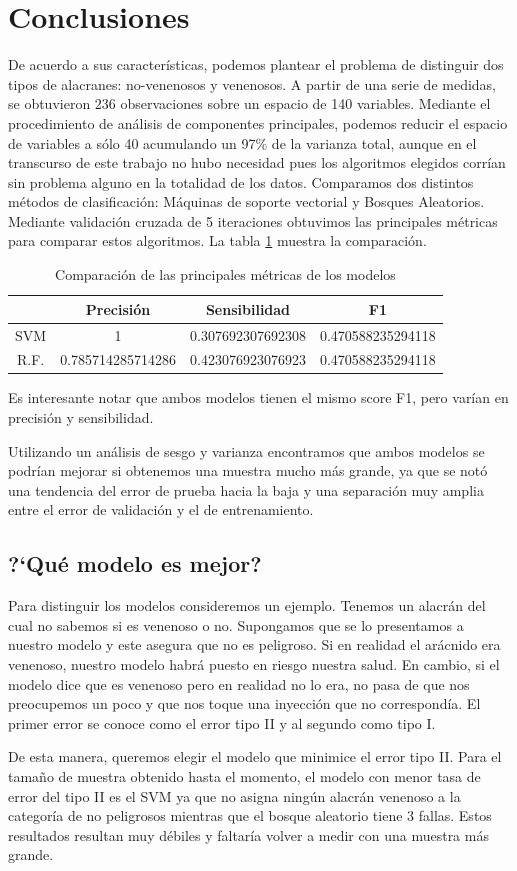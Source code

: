 \documentclass{article}
\begin{document}
\section{Conclusiones}
De acuerdo a sus características, podemos plantear el problema de distinguir dos tipos de alacranes: no-venenosos y venenosos. A partir de una serie de medidas, se obtuvieron 236 observaciones sobre un espacio de 140 variables. Mediante el procedimiento de análisis de componentes principales, podemos reducir el espacio de variables a sólo 40 acumulando un 97\% de la varianza total, aunque en el transcurso de este trabajo no hubo necesidad pues los algoritmos elegidos corrían sin problema alguno en la totalidad de los datos.
Comparamos dos distintos métodos de clasificación: Máquinas de soporte vectorial y Bosques Aleatorios. Mediante validación cruzada de 5 iteraciones obtuvimos las principales métricas para comparar estos algoritmos. La tabla \ref{tbl:compMod} muestra la comparación.

\begin{table}
  \centering
  \caption{Comparación de las principales métricas de los modelos}
  \begin{tabular}{|c|c|c|c|}
    \hline
    & \textbf{Precisión} & \textbf{Sensibilidad} & \textbf{F1}\\
    \hline
    SVM & 1 & 0.307692307692308 & 0.470588235294118\\
    \hline
    R.F. & 0.785714285714286 & 0.423076923076923 & 0.470588235294118\\
    \hline
  \end{tabular}
  \label{tbl:compMod}
\end{table}

Es interesante notar que ambos modelos tienen el mismo score F1, pero varían en precisión y sensibilidad. 

Utilizando un análisis de sesgo y varianza encontramos que ambos modelos se podrían mejorar si obtenemos una muestra mucho más grande, ya que se notó una tendencia del error de prueba hacia la baja y una separación muy amplia entre el error de validación y el de entrenamiento.

\subsection{?`Qué modelo es mejor?}
Para distinguir los modelos consideremos un ejemplo. Tenemos un alacrán del cual no sabemos si es venenoso o no. Supongamos que se lo presentamos a nuestro modelo y este asegura que no es peligroso. Si en realidad el arácnido era venenoso, nuestro modelo habrá puesto en riesgo nuestra salud. En cambio, si el modelo dice que es venenoso pero en realidad no lo era, no pasa de que nos preocupemos un poco y que nos toque una inyección que no correspondía. El primer error se conoce como el error tipo II y al segundo como tipo I.

De esta manera, queremos elegir el modelo que minimice el error tipo II. Para el tamaño de muestra obtenido hasta el momento, el modelo con menor tasa de error del tipo II es el SVM ya que no asigna ningún alacrán venenoso a la categoría de no peligrosos mientras que el bosque aleatorio tiene 3 fallas. Estos resultados resultan muy débiles y faltaría volver a medir con una muestra más grande.
\end{document}
